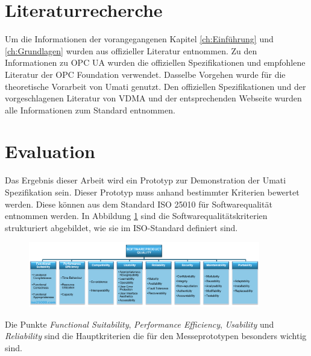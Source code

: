 \documentclass[a4paper, 12pt, oneside]{scrbook}
\begin{document}
	\section{Literaturrecherche}
	
	Um die Informationen der vorangegangenen Kapitel \ref{ch:Einführung} und \ref{ch:Grundlagen} wurden aus offizieller Literatur entnommen. Zu den Informationen zu OPC UA wurden die offiziellen Spezifikationen und empfohlene Literatur der OPC Foundation verwendet. Dasselbe Vorgehen wurde für die theoretische Vorarbeit von Umati genutzt. Den offiziellen Spezifikationen und der vorgeschlagenen Literatur von VDMA und der entsprechenden Webseite wurden alle Informationen zum Standard entnommen.
	
	
	
	\section{Evaluation}
	
	
	Das Ergebnis dieser Arbeit wird ein Prototyp zur Demonstration der Umati Spezifikation sein. Dieser Prototyp muss anhand bestimmter Kriterien bewertet werden. Diese können aus dem Standard ISO 25010 für Softwarequalität entnommen werden. In Abbildung \ref{fig:ISO25010} sind die Softwarequalitätskriterien strukturiert abgebildet, wie sie im ISO-Standard definiert sind. 
	
	\begin{figure}[H]
		\centering
		\includegraphics[width=0.9\textwidth]{res/diagramms/iso25010.png}
		\caption{} 
		\label{fig:ISO25010}
	\end{figure}
	
	Die Punkte \textit{Functional Suitability}, \textit{Performance Efficiency}, \textit{Usability} und \textit{Reliability} sind die Hauptkriterien die für den Messeprototypen besonders wichtig sind. 
	
	
	
	
\end{document}
